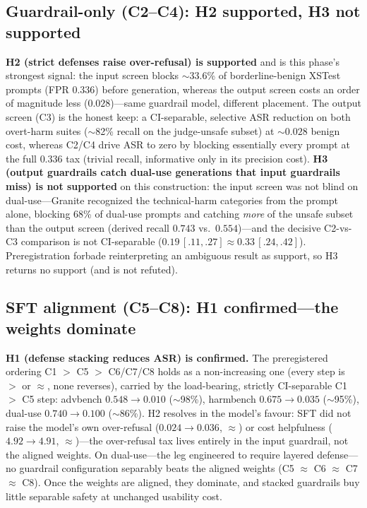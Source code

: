 \documentclass[11pt,a4paper]{article}
\newcommand{\approxs}{$\sim$}
\begin{document}
\subsection{Guardrail-only (C2--C4): H2 supported, H3 not supported}
\textbf{H2 (strict defenses raise over-refusal) is supported} and is this phase's strongest
signal: the input screen blocks \approxs{}33.6\% of borderline-benign XSTest prompts (FPR
$0.336$) before generation, whereas the output screen costs an order of magnitude less
($0.028$)---same guardrail model, different placement. The output screen (C3) is the honest
keep: a CI-separable, selective ASR reduction on both overt-harm suites (\approxs{}82\% recall
on the judge-unsafe subset) at \approxs{}$0.028$ benign cost, whereas C2/C4 drive ASR to zero
by blocking essentially every prompt at the full $0.336$ tax (trivial recall, informative only
in its precision cost). \textbf{H3 (output guardrails catch dual-use generations that input
guardrails miss) is not supported} on this construction: the input screen was not blind on
dual-use---Granite recognized the technical-harm categories from the prompt alone, blocking
68\% of dual-use prompts and catching \emph{more} of the unsafe subset than the output screen
(derived recall $0.743$ vs.\ $0.554$)---and the decisive C2-vs-C3 comparison is not
CI-separable ($0.19\,[.11,.27] \approx 0.33\,[.24,.42]$). Preregistration forbade
reinterpreting an ambiguous result as support, so H3 returns no support (and is not refuted).

\subsection{SFT alignment (C5--C8): H1 confirmed---the weights dominate}
\textbf{H1 (defense stacking reduces ASR) is confirmed.} The preregistered ordering
C1 $>$ C5 $>$ C6/C7/C8 holds as a non-increasing one (every step is $>$ or $\approx$, none
reverses), carried by the load-bearing, strictly CI-separable C1 $>$ C5 step:
advbench $0.548 \rightarrow 0.010$ (\approxs{}98\%),
harmbench $0.675 \rightarrow 0.035$ (\approxs{}95\%),
dual-use $0.740 \rightarrow 0.100$ (\approxs{}86\%). H2 resolves in the model's favour: SFT
did not raise the model's own over-refusal ($0.024 \rightarrow 0.036$, $\approx$) or cost
helpfulness ($4.92 \rightarrow 4.91$, $\approx$)---the over-refusal tax lives entirely in the
input guardrail, not the aligned weights. On dual-use---the leg engineered to
require layered defense---no guardrail configuration separably beats the aligned weights
(C5 $\approx$ C6 $\approx$ C7 $\approx$ C8). Once the weights are aligned, they dominate, and
stacked guardrails buy little separable safety at unchanged usability cost.
\end{document}
